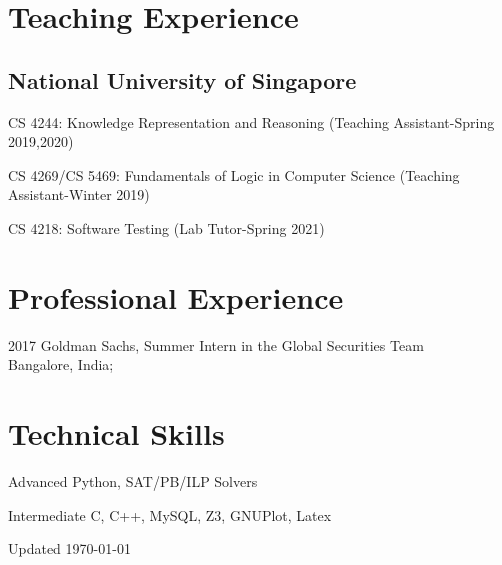 \documentclass[12pt,letterpaper]{report}
\newcommand{\listitemspace}{0.15em}
\renewenvironment{itemize}
{\begin{list}{}{\setlength{\leftmargin}{0em}
            \setlength{\parskip}{0em}
            \setlength{\itemsep}{\listitemspace}
            \setlength{\parsep}{\listitemspace}}}
    {\end{list}}
\begin{document}
    \section*{Teaching Experience}

    \subsection*{National University of Singapore}
    
    \begin{itemize}
    	  	
 \item   CS 4244: Knowledge Representation and Reasoning (Teaching Assistant-Spring 2019,2020)
  \item   CS 4269/CS 5469: Fundamentals of Logic in Computer Science (Teaching Assistant-Winter 2019)
  \item   CS 4218: Software Testing (Lab Tutor-Spring 2021)
    
	\end{itemize}
    
    \section*{Professional Experience}

    \begin{tablist}
        \item[2017] \tab Goldman Sachs, Summer Intern in the Global Securities Team\\
        Bangalore, India;
    \end{tablist}
	\section*{Technical Skills}

	\begin{tablist}
		\item[Advanced] \tab Python, SAT/PB/ILP Solvers
		\item[Intermediate] \tab C, C++, MySQL, Z3, GNUPlot, Latex
	\end{tablist}
    \begin{center}
        \vfill
        Updated \monthyeardate\today
    \end{center}
\end{document}
